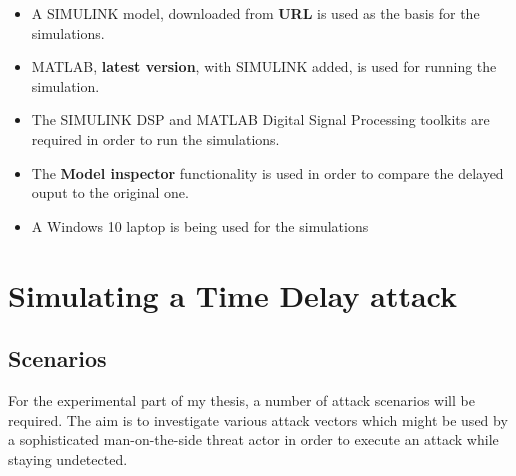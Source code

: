 \begin{itemize}
    \item A SIMULINK model, downloaded from \textbf{URL} is used as the basis for the simulations.
    \item MATLAB, \textbf{latest version}, with SIMULINK added, is used for running the simulation. 
    \item The SIMULINK DSP and MATLAB Digital Signal Processing toolkits are required in order to run the simulations.
    \item The \textbf{Model inspector} functionality is used in order to compare the delayed ouput to the original one.
    \item A Windows 10 laptop is being used for the simulations
    

\end{itemize}





\section{Simulating a Time Delay attack}



\subsection{Scenarios}

For the experimental part of my thesis, a number of attack scenarios will be required. The aim is to investigate various attack vectors which might be used by a sophisticated man-on-the-side threat actor in order to execute an attack while staying undetected. 

